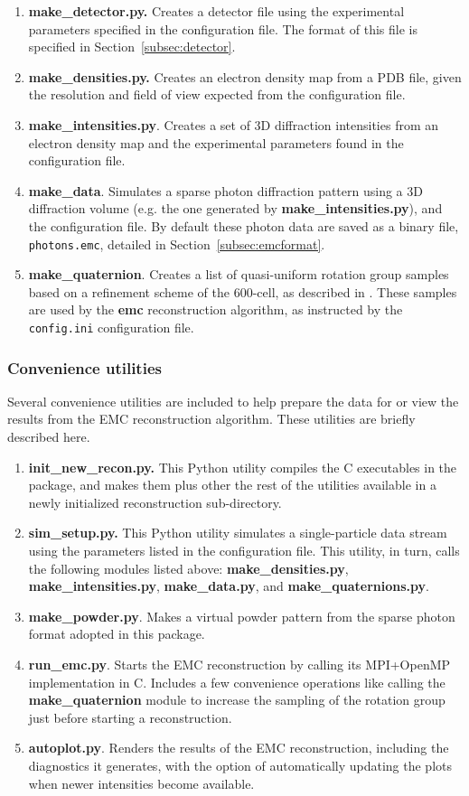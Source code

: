 \documentclass[]{iucr}              %
\begin{document}
\begin{enumerate}
\item{\bf make\_detector.py.} Creates a detector file using the experimental parameters specified in the configuration file. The format of this file is specified in Section~\ref{subsec:detector}.
\item{\bf make\_densities.py.} Creates an electron density map from a PDB file, given the resolution and field of view expected from the configuration file.
\item{\bf make\_intensities.py}. Creates a set of 3D diffraction intensities from an electron density map and the experimental parameters found in the configuration file.  
\item{\bf make\_data}. Simulates a sparse photon diffraction pattern using a 3D diffraction volume (e.g. the one generated by {\bf make\_intensities.py}), and the configuration file. By default these photon data are saved as a binary file, \texttt{photons.emc}, detailed in Section~\ref{subsec:emcformat}.
\item{\bf make\_quaternion}. Creates a list of quasi-uniform rotation group samples based on a refinement scheme of the 600-cell, as described in . These samples are used by the {\bf emc} reconstruction algorithm, as instructed by the \texttt{config.ini} configuration file.
\end{enumerate}

\subsubsection{Convenience utilities}
Several convenience utilities are included to help prepare the data for or view the results from the EMC reconstruction algorithm. These utilities are briefly described here. 
\begin{enumerate}
\item{\bf init\_new\_recon.py.} This Python utility compiles the C executables in the package, and makes them plus other the rest of the utilities available in a newly initialized reconstruction sub-directory.
\item{\bf sim\_setup.py.} This Python utility simulates a single-particle data stream using the parameters listed in the configuration file. This utility, in turn, calls the following modules listed above: {\bf make\_densities.py}, {\bf make\_intensities.py}, {\bf make\_data.py}, and {\bf make\_quaternions.py}.
\item{\bf make\_powder.py}. Makes a virtual powder pattern from the sparse photon format adopted in this package.
\item{\bf run\_emc.py}. Starts the EMC reconstruction by calling its MPI+OpenMP implementation in C. Includes a few convenience operations like calling the {\bf make\_quaternion} module to increase the sampling of the rotation group just before starting a reconstruction.
\item{\bf autoplot.py}. Renders the results of the EMC reconstruction, including the diagnostics it generates, with the option of automatically updating the plots when newer intensities become available.
\end{enumerate}
\end{document}
